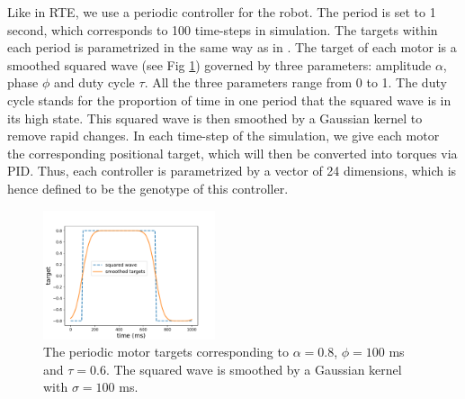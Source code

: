 Like in RTE, we use a periodic controller for the robot.
The period is set to 1 second, which corresponds to 100 time-steps in simulation.
The targets within each period is parametrized in the same way as in \cite{cully2015robots}.
The target of each motor is a smoothed squared wave (see Fig \ref{targets}) governed by three parameters: amplitude $\alpha$, phase $\phi$ and duty cycle $\tau$.
All the three parameters range from 0 to 1.
The duty cycle stands for the proportion of time in one period that the squared wave is in its high state.
This squared wave is then smoothed by a Gaussian kernel to remove rapid changes.
In each time-step of the simulation, we give each motor the corresponding positional target, which will then be converted into torques via PID.
Thus, each controller is parametrized by a vector of 24 dimensions, which is hence defined to be the genotype of this controller.
%
%
\begin{figure}[H]
\centering
\includegraphics[width=0.45\textwidth]{targets.pdf}
\caption{The periodic motor targets corresponding to $\alpha = 0.8$, $\phi=100$ ms and $\tau=0.6$.
The squared wave is smoothed by a Gaussian kernel with $\sigma = 100$ ms.
}
\label{targets}
\end{figure}


